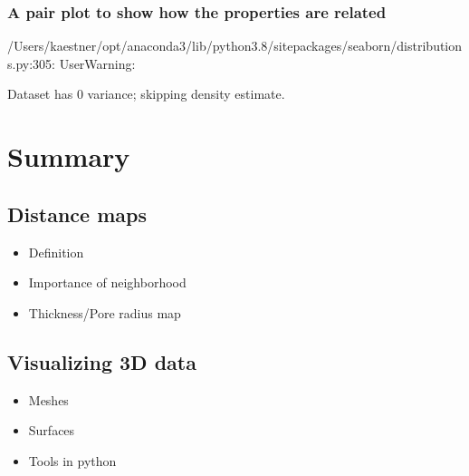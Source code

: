\documentclass[letterpaper,10pt,english]{sphinxmanual}
\begin{document}
\subsection{A pair plot to show how the properties are related}
\label{\detokenize{06-AdvancedShapeAndTexture:a-pair-plot-to-show-how-the-properties-are-related}}
\begin{sphinxVerbatim}[commandchars=\\\{\}]
  
\end{sphinxVerbatim}

\begin{sphinxVerbatim}[commandchars=\\\{\}]
/Users/kaestner/opt/anaconda3/lib/python3.8/site\PYGZhy{}packages/seaborn/distributions.py:305: UserWarning:

Dataset has 0 variance; skipping density estimate.
\end{sphinxVerbatim}

\noindent{}


\chapter{Summary}
\label{\detokenize{06-AdvancedShapeAndTexture:summary}}

\section{Distance maps}
\label{\detokenize{06-AdvancedShapeAndTexture:distance-maps}}\begin{itemize}
\item {} 
\sphinxAtStartPar
Definition

\item {} 
\sphinxAtStartPar
Importance of neighborhood

\item {} 
\sphinxAtStartPar
Thickness/Pore radius map

\end{itemize}


\section{Visualizing 3D data}
\label{\detokenize{06-AdvancedShapeAndTexture:visualizing-3d-data}}\begin{itemize}
\item {} 
\sphinxAtStartPar
Meshes

\item {} 
\sphinxAtStartPar
Surfaces

\item {} 
\sphinxAtStartPar
Tools in python

\end{itemize}
\end{document}

